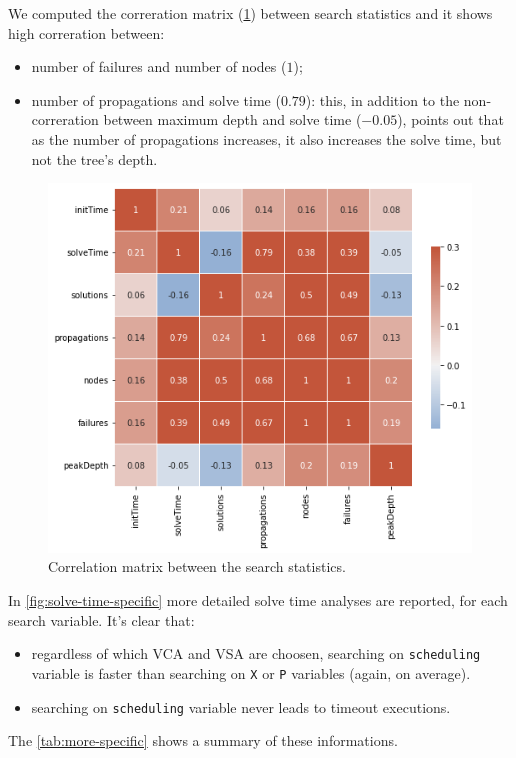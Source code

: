 \documentclass[10pt]{article}
\begin{document}
	We computed the correration matrix (\cref{fig:corr}) between search statistics
	and it shows high correration between:
	\begin{itemize}
		\item number of failures and number of nodes ($1$);
		\item number of propagations and solve time ($0.79$): this, in addition to the non-correration
			between maximum depth and solve time ($-0.05$), points out that as the number of
			propagations increases, it also increases the solve time, but not the tree's depth.
	\end{itemize}

	\begin{figure}
		\centering
		\includegraphics[width=.6\textwidth]{corr.png}
		\caption{Correlation matrix between the search statistics.}
		\label{fig:corr}
	\end{figure}

	In \cref{fig:solve-time-specific} more detailed solve time analyses are
	reported, for each search variable. It's clear that:
	\begin{itemize}
		\item regardless of which 
		VCA and VSA are choosen, searching on \texttt{scheduling} variable is faster
		than searching on \texttt{X} or \texttt{P} variables (again, on average).  
		\item searching on \texttt{scheduling} variable never leads to timeout executions.
	\end{itemize} 

	The \cref{tab:more-specific} shows a summary of these informations. 
\end{document}
